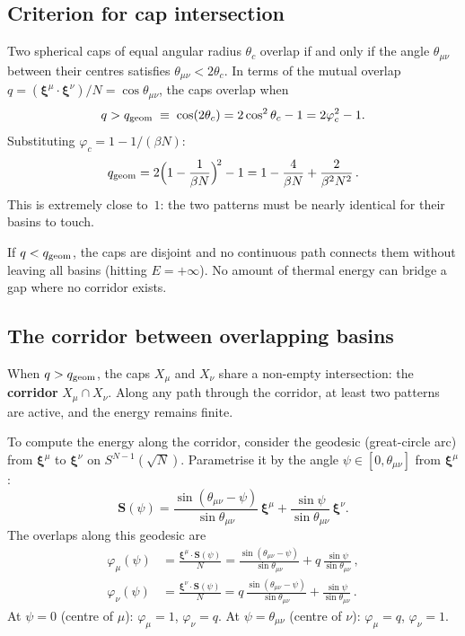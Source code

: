 \documentclass[11pt]{article}
\newcommand{\vp}{\varphi}
\newcommand{\bS}{\mathbf{S}}
\newcommand{\bxi}{\boldsymbol{\xi}}
\begin{document}
\subsection{Criterion for cap intersection}

Two spherical caps of equal angular radius $\theta_c$ overlap
if and only if the angle $\theta_{\mu\nu}$ between their
centres satisfies $\theta_{\mu\nu} < 2\theta_c$.
In terms of the mutual overlap
$q = (\bxi^\mu \cdot \bxi^\nu)/N = \cos\theta_{\mu\nu}$,
the caps overlap when
\begin{equation}\label{eq:qgeom}
  q > q_{\rm geom}
  \;\equiv\; \cos(2\theta_c)
  = 2\cos^2\theta_c - 1
  = 2\vp_c^2 - 1.
\end{equation}
Substituting $\vp_c = 1 - 1/(\beta N)$:
\begin{equation}\label{eq:qgeom_explicit}
  q_{\rm geom}
  = 2\Bigl(1 - \frac{1}{\beta N}\Bigr)^{\!2} - 1
  = 1 - \frac{4}{\beta N} + \frac{2}{\beta^2 N^2}\,.
\end{equation}
This is extremely close to~$1$: the two patterns must be
nearly identical for their basins to touch.

If $q < q_{\rm geom}$, the caps are disjoint and no continuous
path connects them without leaving all basins (hitting $E = +\infty$).
No amount of thermal energy can bridge a gap where no corridor
exists.


\subsection{The corridor between overlapping basins}

When $q > q_{\rm geom}$, the caps $X_\mu$ and $X_\nu$ share
a non-empty intersection: the \textbf{corridor}
$X_\mu \cap X_\nu$.  Along any path through the corridor,
at least two patterns are active, and the energy remains finite.

To compute the energy along the corridor, consider the geodesic
(great-circle arc) from $\bxi^\mu$ to $\bxi^\nu$ on
$S^{N-1}(\sqrt{N})$.
Parametrise it by the angle $\psi \in [0, \theta_{\mu\nu}]$
from $\bxi^\mu$:
\begin{equation}\label{eq:geodesic}
  \bS(\psi)
  = \frac{\sin(\theta_{\mu\nu} - \psi)}{\sin\theta_{\mu\nu}}\,\bxi^\mu
  + \frac{\sin\psi}{\sin\theta_{\mu\nu}}\,\bxi^\nu.
\end{equation}
The overlaps along this geodesic are
\begin{align}
  \vp_\mu(\psi) &= \frac{\bxi^\mu \cdot \bS(\psi)}{N}
  = \frac{\sin(\theta_{\mu\nu} - \psi)}{\sin\theta_{\mu\nu}}
  + q\,\frac{\sin\psi}{\sin\theta_{\mu\nu}}\,,
  \label{eq:phi_mu_psi} \\[4pt]
  \vp_\nu(\psi) &= \frac{\bxi^\nu \cdot \bS(\psi)}{N}
  = q\,\frac{\sin(\theta_{\mu\nu} - \psi)}{\sin\theta_{\mu\nu}}
  + \frac{\sin\psi}{\sin\theta_{\mu\nu}}\,.
  \label{eq:phi_nu_psi}
\end{align}
At $\psi = 0$ (centre of $\mu$): $\vp_\mu = 1$, $\vp_\nu = q$.
At $\psi = \theta_{\mu\nu}$ (centre of $\nu$):
$\vp_\mu = q$, $\vp_\nu = 1$.
\end{document}
